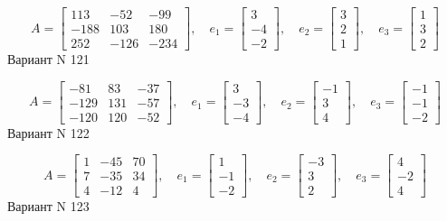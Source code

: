 \documentclass[11pt]{report}
\begin{document}
$$A = \left[\begin{matrix}113 & -52 & -99\\-188 & 103 & 180\\252 & -126 & -234\end{matrix}\right],\quad e_1 = \left[\begin{matrix}3\\-4\\-2\end{matrix}\right],\quad e_2 = \left[\begin{matrix}3\\2\\1\end{matrix}\right],\quad e_3 = \left[\begin{matrix}1\\3\\2\end{matrix}\right]$$Вариант N 121

$$A = \left[\begin{matrix}-81 & 83 & -37\\-129 & 131 & -57\\-120 & 120 & -52\end{matrix}\right],\quad e_1 = \left[\begin{matrix}3\\-3\\-4\end{matrix}\right],\quad e_2 = \left[\begin{matrix}-1\\3\\4\end{matrix}\right],\quad e_3 = \left[\begin{matrix}-1\\-1\\-2\end{matrix}\right]$$Вариант N 122

$$A = \left[\begin{matrix}1 & -45 & 70\\7 & -35 & 34\\4 & -12 & 4\end{matrix}\right],\quad e_1 = \left[\begin{matrix}1\\-1\\-2\end{matrix}\right],\quad e_2 = \left[\begin{matrix}-3\\3\\2\end{matrix}\right],\quad e_3 = \left[\begin{matrix}4\\-2\\4\end{matrix}\right]$$Вариант N 123
\end{document}
